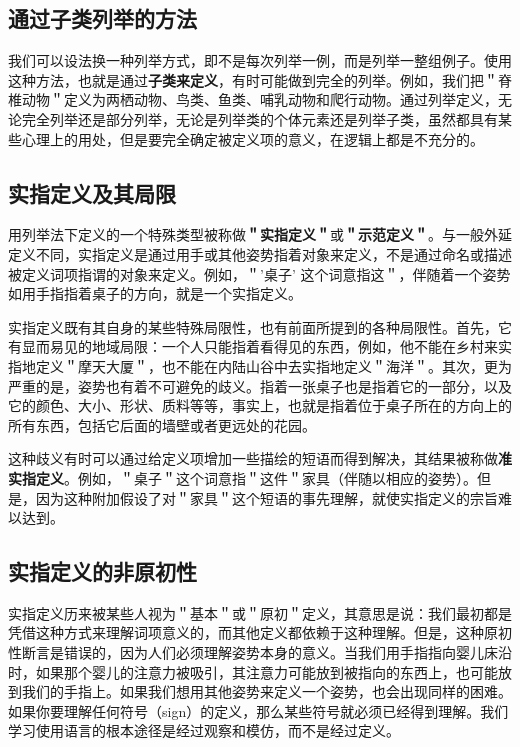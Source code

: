 \subsection{通过子类列举的方法}

我们可以设法换一种列举方式，即不是每次列举一例，而是列举一整组例子。使用这种方法，也就是通过\textbf{子类来定义}，有时可能做到完全的列举。例如，我们把＂脊椎动物＂定义为两栖动物、鸟类、鱼类、哺乳动物和爬行动物。通过列举定义，无论完全列举还是部分列举，无论是列举类的个体元素还是列举子类，虽然都具有某些心理上的用处，但是要完全确定被定义项的意义，在逻辑上都是不充分的。

\subsection{实指定义及其局限}

用列举法下定义的一个特殊类型被称做\textbf{＂实指定义＂}或\textbf{＂示范定义＂}。与一般外延定义不同，实指定义是通过用手或其他姿势指着对象来定义，不是通过命名或描述被定义词项指谓的对象来定义。例如，＂'桌子' 这个词意指这＂，伴随着一个姿势如用手指指着桌子的方向，就是一个实指定义。

实指定义既有其自身的某些特殊局限性，也有前面所提到的各种局限性。首先，它有显而易见的地域局限：一个人只能指着看得见的东西，例如，他不能在乡村来实指地定义＂摩天大厦＂，也不能在内陆山谷中去实指地定义＂海洋＂。其次，更为严重的是，姿势也有着不可避免的歧义。指着一张桌子也是指着它的一部分，以及它的颜色、大小、形状、质料等等，事实上，也就是指着位于桌子所在的方向上的所有东西，包括它后面的墙壁或者更远处的花园。

这种歧义有时可以通过给定义项增加一些描绘的短语而得到解决，其结果被称做\textbf{准实指定义}。例如，＂桌子＂这个词意指＂这件＂家具（伴随以相应的姿势）。但是，因为这种附加假设了对＂家具＂这个短语的事先理解，就使实指定义的宗旨难以达到。

\subsection{实指定义的非原初性}

实指定义历来被某些人视为＂基本＂或＂原初＂定义，其意思是说：我们最初都是凭借这种方式来理解词项意义的，而其他定义都依赖于这种理解。但是，这种原初性断言是错误的，因为人们必须理解姿势本身的意义。当我们用手指指向婴儿床沿时，如果那个婴儿的注意力被吸引，其注意力可能放到被指向的东西上，也可能放到我们的手指上。如果我们想用其他姿势来定义一个姿势，也会出现同样的困难。如果你要理解任何符号（sign）的定义，那么某些符号就必须已经得到理解。我们学习使用语言的根本途径是经过观察和模仿，而不是经过定义。


